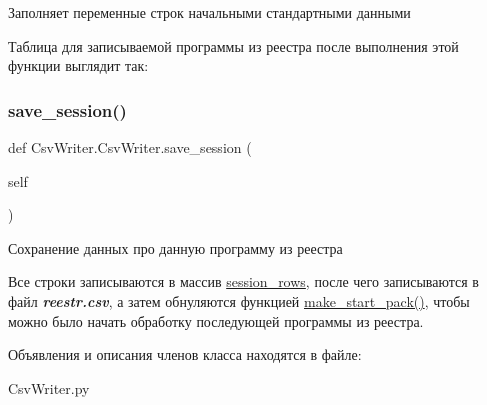 Заполняет переменные строк начальными стандартными данными 

Таблица для записываемой программы из реестра после выполнения этой функции выглядит так\+:  \mbox{\label{classCsvWriter_1_1CsvWriter_a9ce130eed2e7aac0e223740206519836}} 
\subsubsection{\texorpdfstring{save\+\_\+session()}{save\_session()}}
{\footnotesize\ttfamily def Csv\+Writer.\+Csv\+Writer.\+save\+\_\+session (\begin{DoxyParamCaption}\item[{}]{self }\end{DoxyParamCaption})}



Сохранение данных про данную программу из реестра 

Все строки записываются в массив \hyperlink{classCsvWriter_1_1CsvWriter_ab40819d24b9d9d72f273a2663d9543ea}{session\+\_\+rows}, после чего записываются в файл {\itshape {\bfseries reestr.\+csv}}, а затем обнуляются функцией \hyperlink{classCsvWriter_1_1CsvWriter_a82a1a0b729344761424248f4e8357abf}{make\+\_\+start\+\_\+pack()}, чтобы можно было начать обработку последующей программы из реестра. 

Объявления и описания членов класса находятся в файле\+:\begin{DoxyCompactItemize}
\item 
Csv\+Writer.\+py\end{DoxyCompactItemize}
